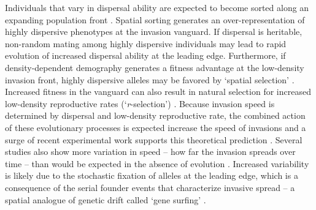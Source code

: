 Individuals that vary in dispersal ability are expected to become sorted along an expanding population front \citep{shine_evolutionary_2011}. Spatial sorting generates an over-representation of highly dispersive phenotypes at the invasion vanguard. If dispersal is heritable, non-random mating among highly dispersive individuals may lead to rapid evolution of increased dispersal ability at the leading edge. Furthermore, if density-dependent demography generates a fitness advantage at the low-density invasion front, highly dispersive alleles may be favored by `spatial selection' \citep{phillips_life-history_2010, perkins_evolution_2013}. Increased fitness in the vanguard can also result in natural selection for increased low-density reproductive rates (`\textit{r}-selection’) \citep{phillips_life-history_2010}. Because invasion speed is determined by dispersal and low-density reproductive rate, the combined action of these evolutionary processes is expected increase the speed of invasions \citep{phillips_evolutionary_2015} and a surge of recent experimental work supports this theoretical prediction \citep{williams_rapid_2016, ochocki_rapid_2017, weiss-lehman_rapid_2017,van2018kin}. Several studies also show more variation in speed -- how far the invasion spreads over time -- than would be expected in the absence of evolution \citep{phillips_evolutionary_2015, ochocki_rapid_2017, weiss-lehman_rapid_2017}. Increased variability is likely due to the stochastic fixation of alleles at the leading edge, which is a consequence of the serial founder events that characterize invasive spread -- a spatial analogue of genetic drift called `gene surfing' \citep{edmonds_mutations_2004,klopfstein_fate_2006,excoffier_surfing_2008,peischl_expansion_2015,phillips_evolutionary_2015, ochocki_rapid_2017, weiss-lehman_rapid_2017}.

